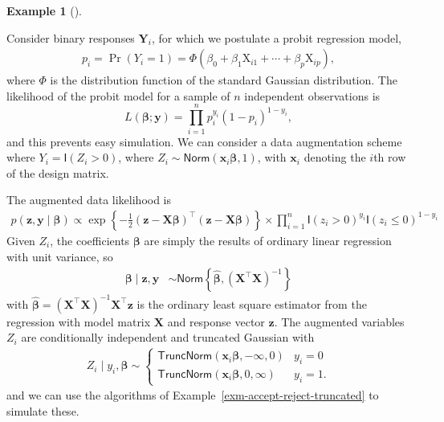 \documentclass[
  11pt,
  letterpaper,
]{scrbook}
\theoremstyle{definition}
\newtheorem{example}{Example}[chapter]
\theoremstyle{definition}
\theoremstyle{definition}
\theoremstyle{plain}
\theoremstyle{remark}
\begin{document}
\begin{example}[]\protect\hypertarget{exm-probit-regression}{}\label{exm-probit-regression}

Consider binary responses \(\boldsymbol{Y}_i\), for which we postulate a
probit regression model, \begin{align*}
p_i = \Pr(Y_i=1) = \Phi(\beta_0 + \beta_1 \mathrm{X}_{i1} + \cdots + \beta_p\mathrm{X}_{ip}),
\end{align*} where \(\Phi\) is the distribution function of the standard
Gaussian distribution. The likelihood of the probit model for a sample
of \(n\) independent observations is
\[L(\boldsymbol{\beta}; \boldsymbol{y}) = \prod_{i=1}^n p_i^{y_i}(1-p_i)^{1-y_i},\]
and this prevents easy simulation. We can consider a data augmentation
scheme where \(Y_i = \mathsf{I}(Z_i > 0)\), where
\(Z_i \sim \mathsf{Norm}(\mathbf{x}_i\boldsymbol{\beta}, 1)\), with
\(\mathbf{x}_i\) denoting the \(i\)th row of the design matrix.

The augmented data likelihood is \begin{align*}
p(\boldsymbol{z}, \boldsymbol{y} \mid \boldsymbol{\beta}) \propto \exp\left\{-\frac{1}{2}(\boldsymbol{z} - \mathbf{X}\boldsymbol{\beta})^\top(\boldsymbol{z} - \mathbf{X}\boldsymbol{\beta})\right\} \times \prod_{i=1}^n \mathsf{I}(z_i > 0)^{y_i}\mathsf{I}(z_i \le 0)^{1-y_i}
\end{align*} Given \(Z_i\), the coefficients \(\boldsymbol{\beta}\) are
simply the results of ordinary linear regression with unit variance, so
\begin{align*}
\boldsymbol{\beta} \mid \boldsymbol{z}, \boldsymbol{y} &\sim \mathsf{Norm}\left\{\widehat{\boldsymbol{\beta}}, (\mathbf{X}^\top\mathbf{X})^{-1}\right\}
\end{align*} with
\(\widehat{\boldsymbol{\beta}}=(\mathbf{X}^\top\mathbf{X})^{-1}\mathbf{X}^\top\boldsymbol{z}\)
is the ordinary least square estimator from the regression with model
matrix \(\mathbf{X}\) and response vector \(\boldsymbol{z}\). The
augmented variables \(Z_i\) are conditionally independent and truncated
Gaussian with \begin{align*}
Z_i \mid y_i, \boldsymbol{\beta} \sim \begin{cases}
\mathsf{TruncNorm}(\mathbf{x}_i\boldsymbol{\beta}, -\infty, 0) & y_i =0 \\
\mathsf{TruncNorm}(\mathbf{x}_i\boldsymbol{\beta}, 0, \infty) & y_i =1.
\end{cases}
\end{align*} and we can use the algorithms of
Example~\ref{exm-accept-reject-truncated} to simulate these.


\end{example}
\end{document}
